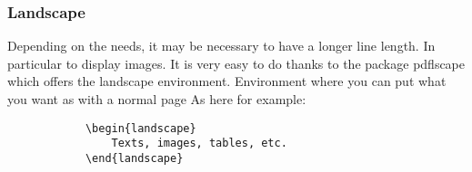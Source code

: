 \begin{landscape}
    \subsubsection{Landscape}
    Depending on the needs, it may be necessary to have a longer line length. In particular to
    display images.
    It is very easy to do thanks to the package pdflscape which offers the landscape environment.
    Environment where you can put what you want as with a normal page
    As here for example:
    \begin{code}
        \begin{verbatim}
            \begin{landscape}
                Texts, images, tables, etc.
            \end{landscape}
    \end{verbatim}
        \caption{Use of landscape}
    \end{code}
\end{landscape}
